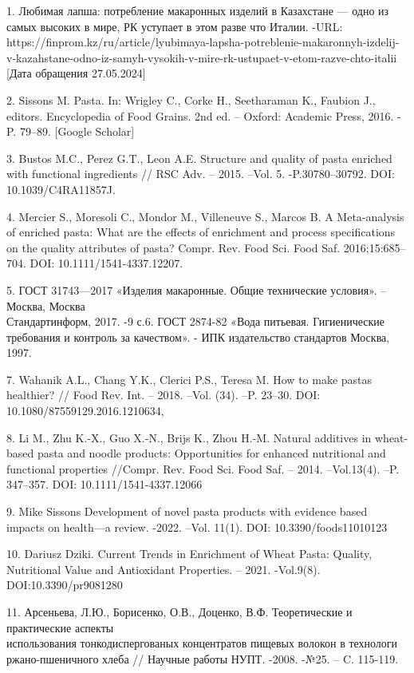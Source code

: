 \begin{noparindent}

1. Любимая лапша: потребление макаронных изделий в Казахстане --- одно
из самых высоких в мире, РК уступает в этом разве что Италии. -URL:
https://finprom.kz/ru/article/lyubimaya-lapsha-potreblenie-makaronnyh-izdelij-v-kazahstane-odno-iz-samyh-vysokih-v-mire-rk-ustupaet-v-etom-razve-chto-italii
\\{[}Дата обращения 27.05.2024{]}

2. Sissons M. Pasta. In: Wrigley C., Corke H., Seetharaman K., Faubion
J., editors. Encyclopedia of Food Grains. 2nd ed. -- Oxford: Academic
Press, 2016. - P. 79--89. {[}Google Scholar{]}

3. Bustos M.C., Perez G.T., Leon A.E. Structure and quality of pasta
enriched with functional ingredients // RSC Adv. -- 2015. --Vol. 5.
-P.30780--30792. DOI: 10.1039/C4RA11857J.

4. Mercier S., Moresoli C., Mondor M., Villeneuve S., Marcos B. A
Meta-analysis of enriched pasta: What are the effects of enrichment and
process specifications on the quality attributes of pasta? Compr. Rev.
Food Sci. Food Saf. 2016;15:685--704. DOI: 10.1111/1541-4337.12207.

5. ГОСТ 31743---2017 «Изделия макаронные. Общие технические условия».
--Москва, Москва \\Стандартинформ, 2017. -9 с.6. ГОСТ 2874-82 «Вода
питьевая. Гигиенические требования и контроль за качеством». - ИПК
издательство стандартов Москва, 1997.

7. Wahanik A.L., Chang Y.K., Clerici P.S., Teresa M. How to make pastas
healthier? // Food Rev. Int. -- 2018. --Vol. (34). --P. 23--30. DOI:
10.1080/87559129.2016.1210634,

8. Li M., Zhu K.-X., Guo X.-N., Brijs K., Zhou H.-M. Natural additives
in wheat-based pasta and noodle products: Opportunities for enhanced
nutritional and functional properties //Compr. Rev. Food Sci. Food Saf.
-- 2014. --Vol.13(4). --P. 347--357. DOI: 10.1111/1541-4337.12066

9. Mike Sissons Development of novel pasta products with evidence based
impacts on health---a review. -2022. --Vol. 11(1). DOI:
10.3390/foods11010123

10. Dariusz Dziki. Current Trends in Enrichment of Wheat Pasta: Quality,
Nutritional Value and Antioxidant Properties. -- 2021. -Vol.9(8).
DOI:10.3390/pr9081280

11. Арсеньева, Л.Ю., Борисенко, О.В., Доценко, В.Ф. Теоретические и
практические аспекты \\использования тонкодиспергованых концентратов
пищевых волокон в технологи ржано-пшеничного хлеба // Научные работы
НУПТ. -2008. -№25. -- C. 115-119.


\end{noparindent}
